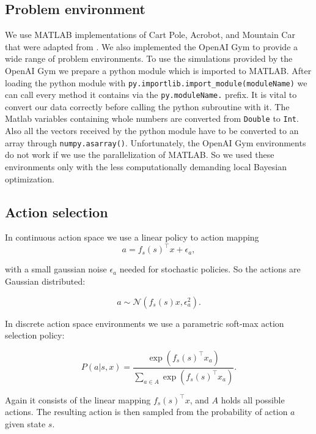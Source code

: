 \subsection{Problem environment}
We use MATLAB implementations of Cart Pole, Acrobot, and Mountain Car that were adapted from \cite{joseCode}. We also implemented the OpenAI Gym to provide a wide range of problem environments. To use the simulations provided by the OpenAI Gym we prepare a python module which is imported to MATLAB. After loading the python module with \verb|py.importlib.import_module(moduleName)| we can call every method it contains via the \verb|py.moduleName.| prefix. It is vital to convert our data correctly before calling the python subroutine with it. The Matlab variables containing whole numbers are converted from \verb|Double| to \verb|Int|. Also all the vectors received by the python module have to be converted to an array through \verb|numpy.asarray()|. Unfortunately, the OpenAI Gym environments do not work if we use the parallelization of MATLAB. So we used these environments only with the less computationally demanding local Bayesian optimization.\\

\subsection{Action selection}
\label{sec:actionselection}
In continuous action space we use a linear policy to action mapping
\begin{equation} \label{eq:actionselection}
    a = f_s(s)^\top x + \epsilon_a,
\end{equation}

with a small gaussian noise $\epsilon_a$ needed for stochastic policies. So the actions are Gaussian distributed:

$$a \sim \mathcal{N}(f_s(s) x,\epsilon_a^2).$$

In discrete action space environments we use a parametric soft-max action selection policy:

\begin{equation} \label{eq:discreteactionselection}
    P(a|s,x)= \frac{\exp(f_s(s)^\top x_a)}{\sum_{a\in A} \exp(f_s(s)^\top x_a)}.
\end{equation}

Again it consists of the linear mapping $f_s(s)^\top x$, and $A$ holds all possible actions. The resulting action is then sampled from the probability of action $a$ given state $s$.

